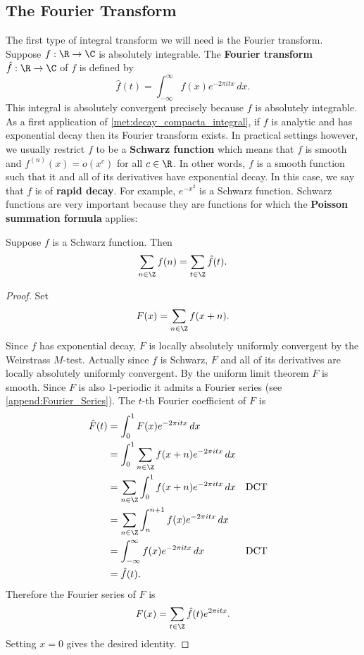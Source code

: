       \subsection*{The Fourier Transform}
        The first type of integral transform we will need is the Fourier transform. Suppose $f:\R \to \C$ is absolutely integrable. The \textbf{Fourier transform} $\hat{f}:\R \to \C$ of $f$ is defined by
        \[
          \hat{f}(t) = \int_{-\infty}^{\infty}f(x)e^{-2\pi itx}\,dx.
        \]
        This integral is absolutely convergent precisely because $f$ is absolutely integrable. As a first application of \cref{met:decay_compacta_integral}, if $f$ is analytic and has exponential decay then its Fourier transform exists. In practical settings however, we usually restrict $f$ to be a \textbf{Schwarz function} which means that $f$ is smooth and $f^{(n)}(x) = o(x^{c})$ for all $c \in \R$. In other words, $f$ is a smooth function such that it and all of its derivatives have exponential decay. In this case, we say that $f$ is of \textbf{rapid decay}. For example, $e^{-x^{2}}$ is a Schwarz function. Schwarz functions are very important because they are functions for which the \textbf{Poisson summation formula} applies:

        \begin{theorem}
          Suppose $f$ is a Schwarz function. Then
          \[
            \sum_{n \in \Z}f(n) = \sum_{t \in \Z}\hat{f}(t).
          \]
        \end{theorem}
        \begin{proof}
          Set
          \[
            F(x) = \sum_{n \in \Z}f(x+n).
          \]
          Since $f$ has exponential decay, $F$ is locally absolutely uniformly convergent by the Weirstrass $M$-test. Actually since $f$ is Schwarz, $F$ and all of its derivatives are locally absolutely uniformly convergent. By the uniform limit theorem $F$ is smooth. Since $F$ is also $1$-periodic it admits a Fourier series (see \cref{append:Fourier_Series}). The $t$-th Fourier coefficient of $F$ is
          \begin{align*}
            \hat{F}(t) &= \int_{0}^{1}F(x)e^{-2\pi itx}\,dx \\
            &= \int_{0}^{1}\sum_{n \in \Z}f(x+n)e^{-2\pi itx}\,dx \\
            &= \sum_{n \in \Z}\int_{0}^{1}f(x+n)e^{-2\pi itx}\,dx && \text{DCT} \\
            &= \sum_{n \in \Z}\int_{n}^{n+1}f(x)e^{-2\pi itx}\,dx \\
            &= \int_{-\infty}^{\infty}f(x)e^{-2\pi itx}\,dx && \text{DCT} \\
            &= \hat{f}(t).
          \end{align*}
          Therefore the Fourier series of $F$ is
          \[
            F(x) = \sum_{t \in \Z}\hat{f}(t)e^{2\pi itx}.
          \]
          Setting $x = 0$ gives the desired identity.
        \end{proof}

